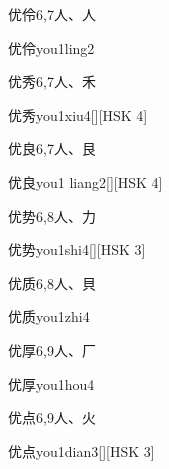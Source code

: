 \begin{entry}{优伶}{6,7}{⼈、⼈}
  \begin{phonetics}{优伶}{you1ling2}
  \end{phonetics}
\end{entry}

\begin{entry}{优秀}{6,7}{⼈、⽲}
  \begin{phonetics}{优秀}{you1xiu4}[][HSK 4]
  \end{phonetics}
\end{entry}

\begin{entry}{优良}{6,7}{⼈、⾉}
  \begin{phonetics}{优良}{you1 liang2}[][HSK 4]
  \end{phonetics}
\end{entry}

\begin{entry}{优势}{6,8}{⼈、⼒}
  \begin{phonetics}{优势}{you1shi4}[][HSK 3]
  \end{phonetics}
\end{entry}

\begin{entry}{优质}{6,8}{⼈、⾙}
  \begin{phonetics}{优质}{you1zhi4}
  \end{phonetics}
\end{entry}

\begin{entry}{优厚}{6,9}{⼈、⼚}
  \begin{phonetics}{优厚}{you1hou4}
  \end{phonetics}
\end{entry}

\begin{entry}{优点}{6,9}{⼈、⽕}
  \begin{phonetics}{优点}{you1dian3}[][HSK 3]
  \end{phonetics}
\end{entry}

